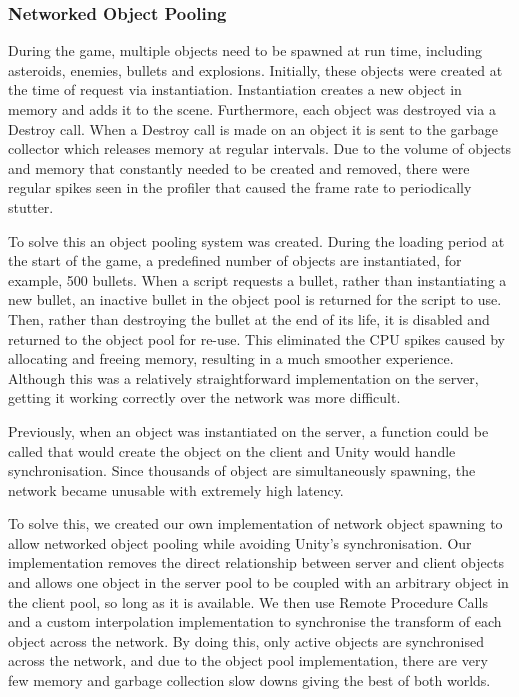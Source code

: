 \documentclass[a4paper,11pt]{article}
\begin{document}
\subsubsection{Networked Object Pooling}
During the game, multiple objects need to be spawned at run time, including asteroids, enemies, bullets and explosions. Initially, these objects were created at the time of request via instantiation. Instantiation creates a new object in memory and adds it to the scene. Furthermore, each object was destroyed via a Destroy call. When a Destroy call is made on an object it is sent to the garbage collector which releases memory at regular intervals. Due to the volume of objects and memory that constantly needed to be created and removed, there were regular spikes seen in the profiler that caused the frame rate to periodically stutter.

To solve this an object pooling system was created. During the loading period at the start of the game, a predefined number of objects are instantiated, for example, 500 bullets. When a script requests a bullet, rather than instantiating a new bullet, an inactive bullet in the object pool is returned for the script to use. Then, rather than destroying the bullet at the end of its life, it is disabled and returned to the object pool for re-use. This eliminated the CPU spikes caused by allocating and freeing memory, resulting in a much smoother experience. Although this was a relatively straightforward implementation on the server, getting it working correctly over the network was more difficult. 

Previously, when an object was instantiated on the server, a function could be called that would create the object on the client and Unity would handle synchronisation. Since thousands of object are   simultaneously spawning, the network became unusable with extremely high latency. 

To solve this, we created our own implementation of network object spawning to allow networked object pooling while avoiding Unity’s synchronisation. Our implementation removes the direct relationship between server and client objects and allows one object in the server pool to be coupled with an arbitrary object in the client pool, so long as it is available. We then use Remote Procedure Calls and a custom interpolation implementation to synchronise the transform of each object across the network. By doing this, only active objects are synchronised across the network, and due to the object pool implementation, there are very few memory and garbage collection slow downs giving the best of both worlds.
\end{document}
